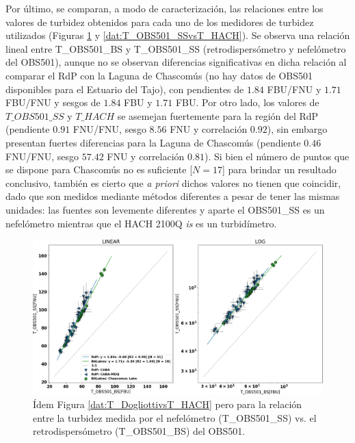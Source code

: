         Por último, se comparan, a modo de caracterización, las relaciones entre los valores de turbidez obtenidos para cada uno de los medidores de turbidez utilizados (Figuras \ref{dat:T_OBS501_SSvsT_OBS501_BS} y \ref{dat:T_OBS501_SSvsT_HACH}). Se observa una relación lineal entre T\_OBS501\_BS y T\_OBS501\_SS (retrodispersómetro y nefelómetro del OBS501), aunque no se observan diferencias significativas en dicha relación al comparar el RdP con la Laguna de Chascomús (no hay datos de OBS501 disponibles para el Estuario del Tajo), con pendientes de $1.84$ FBU/FNU y $1.71$ FBU/FNU y sesgos de $1.84$ FBU y $1.71$ FBU. Por otro lado, los valores de $T\_OBS501\_SS$ y $T\_HACH$ se asemejan fuertemente para la región del RdP (pendiente $0.91$ FNU/FNU, sesgo $8.56$ FNU y correlación $0.92$), sin embargo presentan fuertes diferencias para la Laguna de Chascomús (pendiente $0.46$ FNU/FNU, sesgo $57.42$ FNU y correlación $0.81$). Si bien el número de puntos que se dispone para Chascomús no es suficiente [$N = 17$] para brindar un resultado conclusivo, también es cierto que \textit{a priori} dichos valores no tienen que coincidir, dado que son medidos mediante métodos diferentes a pesar de tener las mismas unidades: las fuentes son levemente diferentes y aparte el OBS501\_SS es un nefelómetro mientras que el HACH 2100Q \textit{is} es un turbidímetro.
        
        \begin{figure}
        \centering
        \includegraphics[width=\textwidth]{dat/figures/ScatterT_OBS501_SSvsT_OBS501_BS.png}
        \caption{Ídem Figura \ref{dat:T_DogliottivsT_HACH} pero para la relación entre la turbidez medida por el nefelómetro (T\_OBS501\_SS) vs. el retrodispersómetro (T\_OBS501\_BS) del OBS501.}
        \label{dat:T_OBS501_SSvsT_OBS501_BS}
        \end{figure}
        
